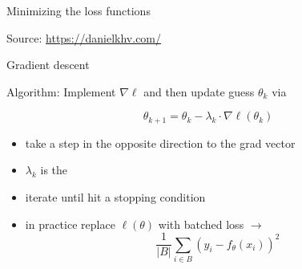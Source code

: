 \begin{frame}

    Minimizing the loss functions  
    
    \begin{figure}
       \begin{center}
       \end{center}
    \end{figure}

    Source: \url{https://danielkhv.com/}

\end{frame}


\begin{frame}{Gradient descent}

    Algorithm: Implement $\nabla \ell$ and then update guess $\theta_k$ via
    
    \begin{equation*}
        \theta_{k+1} = \theta_k - \lambda_k \cdot \nabla \ell(\theta_k)
    \end{equation*}

    \begin{itemize}
        \item take a step in the opposite direction to the grad vector
        \vspace{0.5em}
        \item $\lambda_k$ is the  
        \vspace{0.5em}
        \item iterate until hit a stopping condition
        \vspace{0.5em}
        \item in practice replace $\ell(\theta)$ with batched loss $\to$ 
            \begin{equation*}
                \frac{1}{|B|}\sum_{i \in B} (y_i - f_\theta(x_i))^2
            \end{equation*}
    \end{itemize}


\end{frame}


